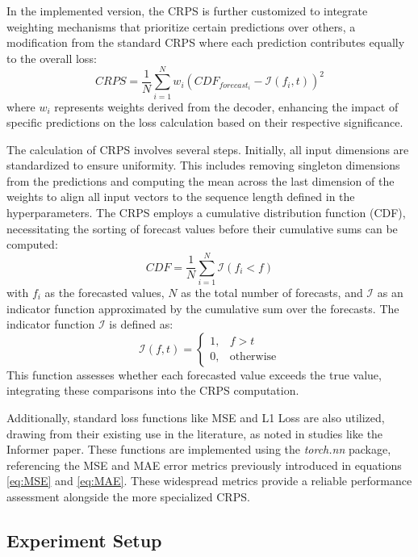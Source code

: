 \documentclass{article}
\begin{document}
In the implemented version, the CRPS is further customized to integrate weighting mechanisms that prioritize certain predictions over others, a modification from the standard CRPS where each prediction contributes equally to the overall loss:
\begin{equation}
    CRPS = \frac{1}{N} \sum^N_{i = 1} w_i (CDF_{forecast_i} - \mathcal{I}(f_i, t))^2
\end{equation}
where $w_i$ represents weights derived from the decoder, enhancing the impact of specific predictions on the loss calculation based on their respective significance.

The calculation of CRPS involves several steps. Initially, all input dimensions are standardized to ensure uniformity. This includes removing singleton dimensions from the predictions and computing the mean across the last dimension of the weights to align all input vectors to the sequence length defined in the hyperparameters. The CRPS employs a cumulative distribution function (CDF), necessitating the sorting of forecast values before their cumulative sums can be computed:
\begin{equation}
    CDF = \frac{1}{N} \sum^N_{i = 1} \mathcal{I}(f_i < f)
\end{equation}
with $f_i$ as the forecasted values, $N$ as the total number of forecasts, and $\mathcal{I}$ as an indicator function approximated by the cumulative sum over the forecasts. The indicator function $\mathcal{I}$ is defined as:
\begin{equation}
    \mathcal{I}(f, t) = \begin{cases}
        1, & f > t \\
        0, & \text{otherwise}
    \end{cases}
\end{equation}
This function assesses whether each forecasted value exceeds the true value, integrating these comparisons into the CRPS computation.

Additionally, standard loss functions like MSE and L1 Loss are also utilized, drawing from their existing use in the literature, as noted in studies like the Informer paper. These functions are implemented using the \textit{torch.nn} package, referencing the MSE and MAE error metrics previously introduced in equations \ref{eq:MSE} and \ref{eq:MAE}. These widespread metrics provide a reliable performance assessment alongside the more specialized CRPS.


\subsection{Experiment Setup}
\end{document}
